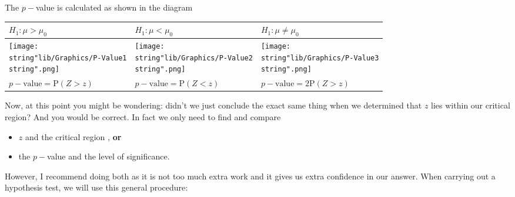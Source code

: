 \documentclass[11pt,a4paper]{book}
\begin{document}
\newpage

The $p-$value is calculated as shown in the diagram

\medskip

\setlength{\extrarowheight}{2pt}%
\begin{tabular}{|>{\centering}p{5cm}|>{\centering}p{5cm}|>{\centering}p{5cm}|}
\hline
$H_{1}:\mu>\mu_{0}$ & $H_{1}:\mu<\mu_{0}$ & $H_{1}:\mu\neq\mu_{0}$\tabularnewline
\hline
\centering{}\texttt{[image: \\string"lib/Graphics/P-Value1\\string".png]} & \centering{}\texttt{[image: \\string"lib/Graphics/P-Value2\\string".png]} & \centering{}\texttt{[image: \\string"lib/Graphics/P-Value3\\string".png]}\tabularnewline
\hline
$p-\text{value}=\text{P}\left(Z>z\right)$ & $p-\text{value}=\text{P}\left(Z<z\right)$ & $p-\text{value}=2\text{P}\left(Z>z\right)$\tabularnewline
\hline
\end{tabular}

\bigskip

Now, at this point you might be wondering: didn't we just conclude
the exact same thing when we determined that $z$ lies within our
critical region? And you would be correct. In fact we only need to
find and compare
\begin{itemize}
\item $z$ and the critical region , \textbf{or}
\item the $p-$value and the level of significance.
\end{itemize}
However, I recommend doing both as it is not too much extra work
and it gives us extra confidence in our answer. When carrying out a hypothesis test, we will use this general procedure:

\medskip
\end{document}
